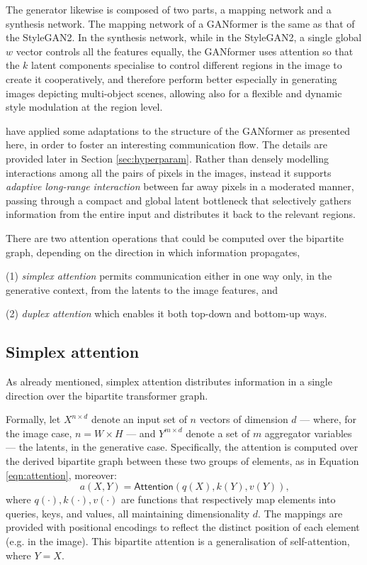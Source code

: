 \documentclass{article}
\begin{document}
	The generator likewise is composed of two parts, a mapping network and a synthesis 
	network. 
	The mapping network of a GANformer is the same as that of the StyleGAN2.
	In the synthesis network, while in the StyleGAN2, a single global $w$ vector controls all the 
	features equally, the GANformer uses attention so that the $k$ latent components specialise to 
	control different regions in the image to create it cooperatively, and therefore perform better 
	especially in generating images depicting multi-object scenes, allowing also for a flexible and 
	dynamic style modulation at the region level.
	
	\citet{hudson2021generative} have applied some adaptations to the structure of the GANformer as 
	presented here, in order to foster an interesting communication flow. The details are provided later 
	in Section \ref{sec:hyperparam}.
	Rather than densely modelling interactions among all the pairs of pixels in the images, instead it 
	supports \textit{adaptive long-range interaction} between far away pixels in a moderated manner, 
	passing through a compact and global latent bottleneck that selectively gathers information from 
	the entire input and distributes it back to the relevant regions. 
	
	There are two attention operations that could be computed over the bipartite graph, depending 
	on the direction in which information propagates, 
	\begin{enumerate*}
		\item [(1)] \textit{simplex attention} permits communication either in one way only, in the 
		generative context, from the latents to the image features, and
		\item [(2)] \textit{duplex attention} which enables it both top-down and bottom-up ways.
	\end{enumerate*}
	
	\subsection{Simplex attention}
	As already mentioned, simplex attention distributes information in a single direction over the 
	bipartite transformer graph. 
	
	Formally, let $X^{n\times d}$ denote an input set of $n$ vectors of dimension $d$ — where, for the 
	image case, $n = W\times H$ — and $Y^{m\times d}$ denote a set of $m$ aggregator variables — 
	the latents, in the generative case. Specifically, the attention is computed over the derived bipartite 
	graph between these two groups of elements, as in Equation \eqref{eqn:attention}, moreover:
	\begin{equation}
		\label{eqn:attention2}
		a(X,Y)=\mathsf{Attention}(q(X), k(Y), v(Y)) \mbox{,}
	\end{equation}
	where $q(\cdot), k(\cdot), v(\cdot)$ are functions that respectively map elements into queries, 
	keys, and values, all maintaining dimensionality $d$. 
	The mappings are provided with positional encodings to reflect the distinct position of each element 
	(e.g. in the image). This bipartite attention is a generalisation of self-attention, where $Y = X$.
	
\end{document}
